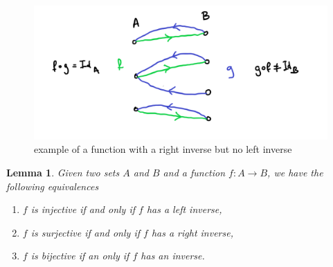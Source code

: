 \documentclass[
]{book}
\newtheorem{lemma}{Lemma}[chapter]
\theoremstyle{definition}
\theoremstyle{definition}
\theoremstyle{definition}
\theoremstyle{definition}
\theoremstyle{remark}
\begin{document}
\begin{figure}
\centering
\includegraphics{leftrightinverse.png}
\caption{\label{fig:unnamed-chunk-20}example of a function with a right inverse but no left inverse}
\end{figure}

\begin{lemma}

Given two sets \(A\) and \(B\) and a function \(f: A \rightarrow B\), we have the following equivalences

\begin{enumerate}
\def\labelenumi{\arabic{enumi}.}
\item
  \(f\) is injective if and only if \(f\) has a left inverse,
\item
  \(f\) is surjective if and only if \(f\) has a right inverse,
\item
  \(f\) is bijective if an only if \(f\) has an inverse.
\end{enumerate}

\end{lemma}
\end{document}
